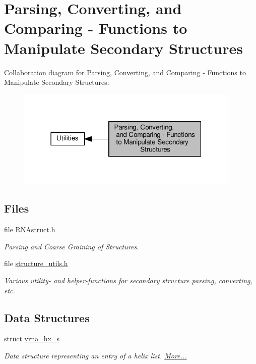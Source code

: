 \hypertarget{group__struct__utils}{}\section{Parsing, Converting, and Comparing -\/ Functions to Manipulate Secondary Structures}
\label{group__struct__utils}
Collaboration diagram for Parsing, Converting, and Comparing -\/ Functions to Manipulate Secondary Structures\+:
\nopagebreak
\begin{figure}[H]
\begin{center}
\leavevmode
\includegraphics[width=303pt]{group__struct__utils}
\end{center}
\end{figure}
\subsection*{Files}
\begin{DoxyCompactItemize}
\item 
file \hyperlink{RNAstruct_8h}{R\+N\+Astruct.\+h}
\begin{DoxyCompactList}\small\item\em Parsing and Coarse Graining of Structures. \end{DoxyCompactList}\item 
file \hyperlink{structure__utils_8h}{structure\+\_\+utils.\+h}
\begin{DoxyCompactList}\small\item\em Various utility-\/ and helper-\/functions for secondary structure parsing, converting, etc. \end{DoxyCompactList}\end{DoxyCompactItemize}
\subsection*{Data Structures}
\begin{DoxyCompactItemize}
\item 
struct \hyperlink{group__struct__utils_structvrna__hx__s}{vrna\+\_\+hx\+\_\+s}
\begin{DoxyCompactList}\small\item\em Data structure representing an entry of a helix list.  \hyperlink{group__struct__utils_structvrna__hx__s}{More...}\end{DoxyCompactList}\end{DoxyCompactItemize}
